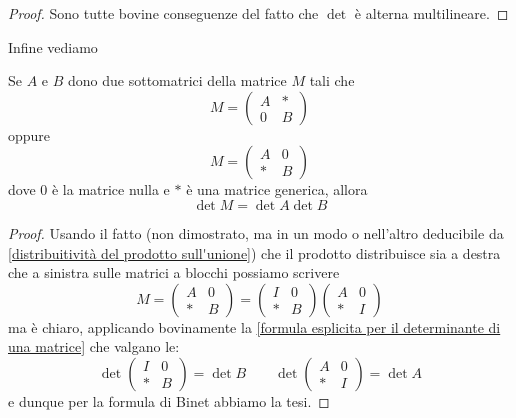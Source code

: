 \documentclass[11pt]{scrartcl}
\begin{document}
   	 \begin{proof}
   	 	Sono tutte bovine conseguenze del fatto che $\det$ è alterna multilineare.
   	 \end{proof}
   	 Infine vediamo 
   	 \begin{lemma}
   	 	Se $A$ e $B$ dono due sottomatrici della matrice $M$ tali che 
   	 	$$M=\left(\begin{array}{c|c}
   	 		A & * \\
   	 		\hline
   	 		0 & B
   	 	\end{array}\right)$$
   	 	oppure 
   	 	$$M=\left(\begin{array}{c|c}
   	 		A & 0 \\
   	 		\hline
   	 		* & B
   	 	\end{array}\right)$$
   	 	dove $0$ è la matrice nulla e $*$ è una matrice generica, allora
   	 	$$\det M = \det A \det B$$
   	 \end{lemma}
   	 \begin{proof}
   	 	Usando il fatto (non dimostrato, ma in un modo o nell'altro deducibile da \ref{distribuitività del prodotto sull'unione}) che il prodotto distribuisce sia a destra che a sinistra sulle matrici a blocchi possiamo scrivere
   	 	$$M=\left(\begin{array}{c|c}
   	 		A & 0 \\
   	 		\hline
   	 		* & B
   	 	\end{array}\right)=\left(\begin{array}{c|c}
   	 	I & 0 \\
   	 	\hline
   	 	* & B
   	 	\end{array}\right)\left(\begin{array}{c|c}
   	 	A & 0 \\
   	 	\hline
   	 	* & I
   	 	\end{array}\right)$$
   	 	ma è chiaro, applicando bovinamente la \ref{formula esplicita per il determinante di una matrice} che valgano le:
   	 	$$\det \left(\begin{array}{c|c}
   	 		I & 0 \\
   	 		\hline
   	 		* & B
   	 	\end{array}\right) = \det B \qquad \det \left(\begin{array}{c|c}
   	 	A & 0 \\
   	 	\hline
   	 	* & I
   	 	\end{array}\right)=\det A$$
   	 	e dunque per la formula di Binet abbiamo la tesi.
   	 \end{proof}
\end{document}
